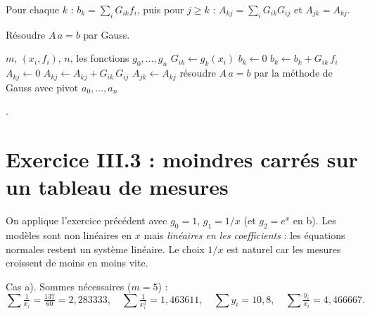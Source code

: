  Pour chaque $k$ : $b_k = \sum_i G_{ik}f_i$, puis pour $j \ge k$ :
$A_{kj} = \sum_i G_{ik}G_{ij}$ et $A_{jk} = A_{kj}$.

 Résoudre $A\,a = b$ par Gauss.

\begin{algo}
  \Require $m$, $(x_i, f_i)$, $n$, les fonctions $g_0, \dots, g_n$
     \State $G_{ik} \leftarrow g_k(x_i)$ \EndFor
  \EndFor
    \State $b_k \leftarrow 0$
     \State $b_k \leftarrow b_k + G_{ik}\,f_i$ \EndFor
      \State $A_{kj} \leftarrow 0$
       \State $A_{kj} \leftarrow A_{kj} + G_{ik}\,G_{ij}$ \EndFor
      \State $A_{jk} \leftarrow A_{kj}$
    \EndFor
  \EndFor
  \State résoudre $A\,a = b$ par la méthode de Gauss avec pivot 
  \Print $a_0, \dots, a_n$
\end{algo}

\Refs {}.

\section{Exercice III.3 : moindres carrés sur un tableau de mesures}


\Pourquoi On applique l'exercice précédent avec $g_0 = 1$, $g_1 = 1/x$
(et $g_2 = e^{x}$ en b). Les modèles sont non linéaires en $x$ mais
\emph{linéaires en les coefficients} : les équations normales restent un
système linéaire. Le choix $1/x$ est naturel car les mesures croissent de moins
en moins vite.

\Etapes
{} Cas a). Sommes nécessaires ($m = 5$) :
\[
  \sum\tfrac1{x_i} = \tfrac{137}{60} = 2{,}283333, \quad
  \sum\tfrac1{x_i^2} = 1{,}463611, \quad
  \sum y_i = 10{,}8, \quad
  \sum\tfrac{y_i}{x_i} = 4{,}466667 .
\]


